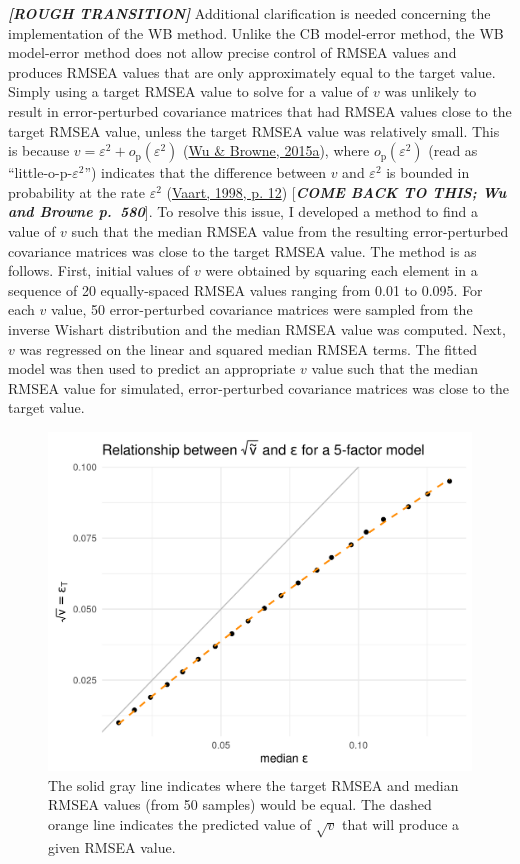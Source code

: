 \documentclass[11pt]{umnthesis}
\begin{document}
\textbf{\emph{{[}ROUGH TRANSITION{]}}} Additional clarification is needed concerning the implementation of the WB method. Unlike the CB model-error method, the WB model-error method does not allow precise control of RMSEA values and produces RMSEA values that are only approximately equal to the target value. Simply using a target RMSEA value to solve for a value of \(v\) was unlikely to result in error-perturbed covariance matrices that had RMSEA values close to the target RMSEA value, unless the target RMSEA value was relatively small. This is because \(v = \varepsilon^2 + o_\textrm{p}(\varepsilon^2)\) (\protect\hyperlink{ref-wu2015}{Wu \& Browne, 2015a}), where \(o_\textrm{p}(\varepsilon^2)\) (read as ``little-o-p-\(\varepsilon^2\)'') indicates that the difference between \(v\) and \(\varepsilon^2\) is bounded in probability at the rate \(\varepsilon^2\) (\protect\hyperlink{ref-vaart1998}{Vaart, 1998, p. 12}) {[}\textbf{\emph{COME BACK TO THIS; Wu and Browne p.~580}}{]}. To resolve this issue, I developed a method to find a value of \(v\) such that the median RMSEA value from the resulting error-perturbed covariance matrices was close to the target RMSEA value. The method is as follows. First, initial values of \(v\) were obtained by squaring each element in a sequence of 20 equally-spaced RMSEA values ranging from 0.01 to 0.095. For each \(v\) value, 50 error-perturbed covariance matrices were sampled from the inverse Wishart distribution and the median RMSEA value was computed. Next, \(v\) was regressed on the linear and squared median RMSEA terms. The fitted model was then used to predict an appropriate \(v\) value such that the median RMSEA value for simulated, error-perturbed covariance matrices was close to the target value.

\begin{figure}

{\centering \includegraphics[width=0.8\linewidth]{img/wb-plot} 

}

\caption[The solid gray line indicates where the target RMSEA and median RMSEA values (from 50 samples) would be equal]{The solid gray line indicates where the target RMSEA and median RMSEA values (from 50 samples) would be equal. The dashed orange line indicates the predicted value of $\sqrt{v}$ that will produce a given RMSEA value.}\label{fig:wb-mod-plot}
\end{figure}
\end{document}
